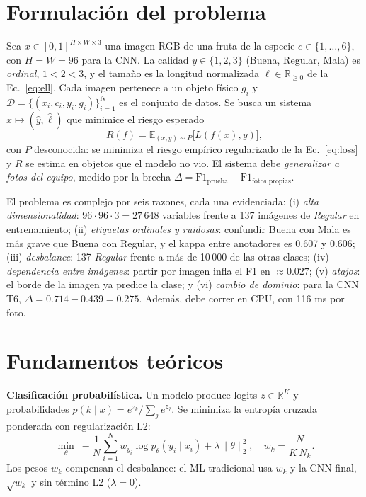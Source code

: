 \documentclass[conference]{IEEEtran}
\begin{document}
\section{Formulaci\'on del problema}
Sea $x\in[0,1]^{H\times W\times 3}$ una imagen RGB de una fruta de la especie $c\in\{1,\dots,6\}$, con $H=W=96$ para la CNN. La calidad $y\in\{1,2,3\}$ (Buena, Regular, Mala) es \emph{ordinal}, $1<2<3$, y el tama\~no es la longitud normalizada $\ell\in\mathbb{R}_{\ge0}$ de la Ec.~\eqref{eq:ell}. Cada imagen pertenece a un objeto f\'isico $g_i$ y $\mathcal{D}=\{(x_i,c_i,y_i,g_i)\}_{i=1}^{N}$ es el conjunto de datos. Se busca un sistema $x\mapsto(\hat y,\hat\ell)$ que minimice el riesgo esperado
\begin{equation}
R(f)=\mathbb{E}_{(x,y)\sim P}\big[L(f(x),y)\big],
\end{equation}
con $P$ desconocida: se minimiza el riesgo emp\'irico regularizado de la Ec.~\eqref{eq:loss} y $R$ se estima en objetos que el modelo no vio. El sistema debe \emph{generalizar a fotos del equipo}, medido por la brecha $\Delta=\mathrm{F1}_{\text{prueba}}-\mathrm{F1}_{\text{fotos propias}}$.

El problema es complejo por seis razones, cada una evidenciada: (i) \emph{alta dimensionalidad}: $96{\cdot}96{\cdot}3=27\,648$ variables frente a 137 im\'agenes de \emph{Regular} en entrenamiento; (ii) \emph{etiquetas ordinales y ruidosas}: confundir Buena con Mala es m\'as grave que Buena con Regular, y el kappa entre anotadores es 0.607 y 0.606; (iii) \emph{desbalance}: 137 \emph{Regular} frente a m\'as de 10\,000 de las otras clases; (iv) \emph{dependencia entre im\'agenes}: partir por imagen infla el F1 en $\approx 0.027$; (v) \emph{atajos}: el borde de la imagen ya predice la clase; y (vi) \emph{cambio de dominio}: para la CNN T6, $\Delta=0.714-0.439=0.275$. Adem\'as, debe correr en CPU, con 116 ms por foto.

\section{Fundamentos te\'oricos}
\textbf{Clasificaci\'on probabil\'istica.} Un modelo produce logits $z\in\mathbb{R}^K$ y probabilidades $p(k\mid x)=e^{z_k}/\sum_j e^{z_j}$. Se minimiza la entrop\'ia cruzada ponderada con regularizaci\'on L2:
\begin{equation}
\min_\theta\; -\frac1N\sum_{i=1}^{N} w_{y_i}\log p_\theta(y_i\mid x_i)+\lambda\lVert\theta\rVert_2^2,\quad w_k=\frac{N}{K\,N_k}.\label{eq:loss}
\end{equation}
Los pesos $w_k$ compensan el desbalance: el ML tradicional usa $w_k$ y la CNN final, $\sqrt{w_k}$ y sin t\'ermino L2 ($\lambda=0$).
\end{document}
